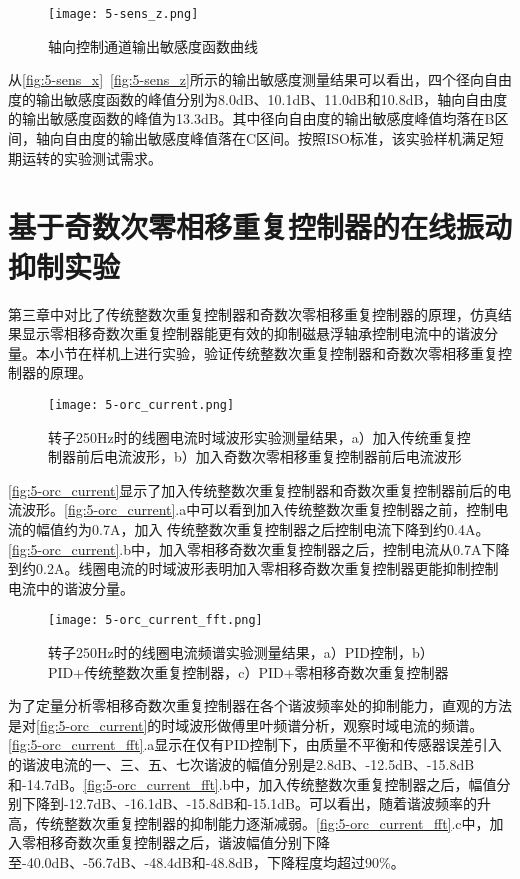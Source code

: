 \begin{figure}
	\texttt{[image: 5-sens\_z.png]}
	\caption{轴向控制通道输出敏感度函数曲线}
	\label{fig:5-sens_z}
\end{figure}

从\autoref{fig:5-sens_x}~\autoref{fig:5-sens_z}所示的输出敏感度测量结果可以看出，四个径向自由度的输出敏感度函数的峰值分别为8.0dB、10.1dB、11.0dB和10.8dB，轴向自由度的输出敏感度函数的峰值为13.3dB。其中径向自由度的输出敏感度峰值均落在B区间，轴向自由度的输出敏感度峰值落在C区间。按照ISO标准，该实验样机满足短期运转的实验测试需求。


\section{基于奇数次零相移重复控制器的在线振动抑制实验}
第三章中对比了传统整数次重复控制器和奇数次零相移重复控制器的原理，仿真结果显示零相移奇数次重复控制器能更有效的抑制磁悬浮轴承控制电流中的谐波分量。本小节在样机上进行实验，验证传统整数次重复控制器和奇数次零相移重复控制器的原理。

\begin{figure}
	\texttt{[image: 5-orc\_current.png]}
	\caption{转子250Hz时的线圈电流时域波形实验测量结果，a）加入传统重复控制器前后电流波形，b）加入奇数次零相移重复控制器前后电流波形}
	\label{fig:5-orc_current}
\end{figure}

\autoref{fig:5-orc_current}显示了加入传统整数次重复控制器和奇数次重复控制器前后的电流波形。\autoref{fig:5-orc_current}.a中可以看到加入传统整数次重复控制器之前，控制电流的幅值约为0.7A，加入
传统整数次重复控制器之后控制电流下降到约0.4A。\autoref{fig:5-orc_current}.b中，加入零相移奇数次重复控制器之后，控制电流从0.7A下降到约0.2A。线圈电流的时域波形表明加入零相移奇数次重复控制器更能抑制控制电流中的谐波分量。

\begin{figure}
	\texttt{[image: 5-orc\_current\_fft.png]}
	\caption{转子250Hz时的线圈电流频谱实验测量结果，a）PID控制，b）PID+传统整数次重复控制器，c）PID+零相移奇数次重复控制器}
	\label{fig:5-orc_current_fft}
\end{figure}

为了定量分析零相移奇数次重复控制器在各个谐波频率处的抑制能力，直观的方法是对\autoref{fig:5-orc_current}的时域波形做傅里叶频谱分析，观察时域电流的频谱。\autoref{fig:5-orc_current_fft}.a显示在仅有PID控制下，由质量不平衡和传感器误差引入的谐波电流的一、三、五、七次谐波的幅值分别是2.8dB、-12.5dB、-15.8dB和-14.7dB。\autoref{fig:5-orc_current_fft}.b中，加入传统整数次重复控制器之后，幅值分别下降到-12.7dB、-16.1dB、-15.8dB和-15.1dB。可以看出，随着谐波频率的升高，传统整数次重复控制器的抑制能力逐渐减弱。\autoref{fig:5-orc_current_fft}.c中，加入零相移奇数次重复控制器之后，谐波幅值分别下降至-40.0dB、-56.7dB、-48.4dB和-48.8dB，下降程度均超过90\%。

